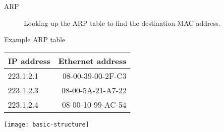 \begin{frame}
  \begin{description}
  \item[ARP] Looking up the ARP table to find the destination MAC address.
  \end{description}
  \begin{minipage}{.5\linewidth}
    \begin{iblock}{Example ARP table}
      {\centering\ttfamily
        \begin{tabular}{lr}
          \toprule
          \textrm{IP address} & \textrm{Ethernet address}\\\midrule
          223.1.2.1 & 08-00-39-00-2F-C3\\
          223.1.2.3 & 08-00-5A-21-A7-22\\
          223.1.2.4 & 08-00-10-99-AC-54\\\bottomrule
        \end{tabular}}
    \end{iblock}
  \end{minipage}\quad
  \begin{minipage}{.3\linewidth}
    \texttt{[image: basic-structure]}
  \end{minipage}
\end{frame}

